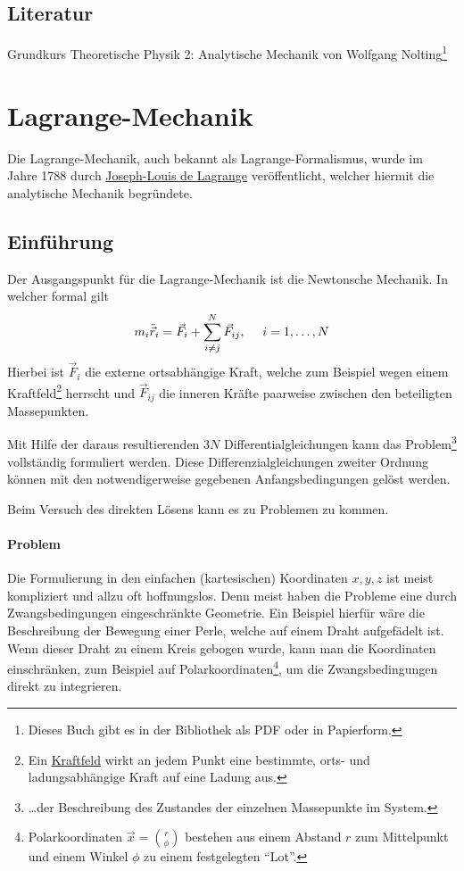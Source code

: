 \subsection{Literatur} Grundkurs Theoretische Physik 2: Analytische Mechanik von Wolfgang Nolting\footnote{Dieses Buch gibt es in der Bibliothek als PDF oder in Papierform.}



\section{Lagrange-Mechanik}

Die Lagrange-Mechanik, auch bekannt als Lagrange-Formalismus, wurde im Jahre 1788 durch \href{http://de.wikipedia.org/wiki/Joseph-Louis_Lagrange}{Joseph-Louis de Lagrange} veröffentlicht, welcher hiermit die analytische Mechanik begründete. 

\subsection{Einführung}
Der Ausgangspunkt für die Lagrange-Mechanik ist die Newtonsche Mechanik. In welcher formal gilt
$$ m_i \ddot{\vec{r}}_i = \vec{F}_i + \sum_{i \neq j}^{N} \vec{F}_{ij}, ~~~~i = 1, \dots, N$$
Hierbei ist $\vec{F}_i$ die externe ortsabhängige Kraft, welche zum Beispiel wegen einem Kraftfeld\footnote{Ein \href{http://de.wikipedia.org/wiki/Kraftfeld}{Kraftfeld} wirkt an jedem Punkt eine bestimmte, orts- und ladungsabhängige Kraft auf eine Ladung aus.} herrscht und $\vec{F}_{ij}$ die inneren Kräfte paarweise zwischen den beteiligten Massepunkten.

Mit Hilfe der daraus resultierenden $3N$ Differentialgleichungen kann das Problem\footnote{\dots der Beschreibung des Zustandes der einzelnen Massepunkte im System.} vollständig formuliert werden. Diese Differenzialgleichungen zweiter Ordnung können mit den notwendigerweise gegebenen Anfangsbedingungen gelöst werden.

Beim Versuch des direkten Lösens kann es zu Problemen zu kommen. 

\paragraph{Problem} Die Formulierung in den einfachen (kartesischen) Koordinaten $x, y, z$ ist meist kompliziert und allzu oft hoffnungslos.
Denn meist haben die Probleme eine durch Zwangsbedingungen eingeschränkte Geometrie. Ein Beispiel hierfür wäre die Beschreibung der Bewegung einer Perle, welche auf einem Draht aufgefädelt ist. Wenn dieser Draht zu einem Kreis gebogen wurde, kann man die Koordinaten einschränken, zum Beispiel auf Polarkoordinaten\footnote{Polarkoordinaten $\vec{x} = \binom{r}{\phi}$ bestehen aus einem Abstand $r$ zum Mittelpunkt und einem Winkel $\phi$ zu einem festgelegten "`Lot"'.}, um die Zwangsbedingungen direkt zu integrieren.

